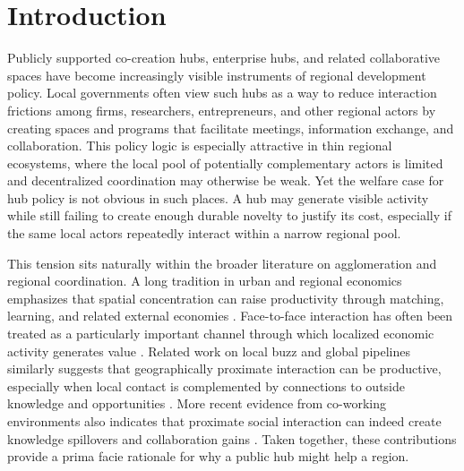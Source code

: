 \section{Introduction}
\label{sec:intro}

Publicly supported co-creation hubs, enterprise hubs, and related collaborative spaces have become increasingly visible instruments of regional development policy. Local governments often view such hubs as a way to reduce interaction frictions among firms, researchers, entrepreneurs, and other regional actors by creating spaces and programs that facilitate meetings, information exchange, and collaboration. This policy logic is especially attractive in thin regional ecosystems, where the local pool of potentially complementary actors is limited and decentralized coordination may otherwise be weak. Yet the welfare case for hub policy is not obvious in such places. A hub may generate visible activity while still failing to create enough durable novelty to justify its cost, especially if the same local actors repeatedly interact within a narrow regional pool.

This tension sits naturally within the broader literature on agglomeration and regional coordination. A long tradition in urban and regional economics emphasizes that spatial concentration can raise productivity through matching, learning, and related external economies \citep{DurantonPuga2004,RosenthalStrange2004}. Face-to-face interaction has often been treated as a particularly important channel through which localized economic activity generates value \citep{StorperVenables2004}. Related work on local buzz and global pipelines similarly suggests that geographically proximate interaction can be productive, especially when local contact is complemented by connections to outside knowledge and opportunities \citep{BatheltMalmbergMaskell2004}. More recent evidence from co-working environments also indicates that proximate social interaction can indeed create knowledge spillovers and collaboration gains \citep{RocheOettlCatalini2024}. Taken together, these contributions provide a prima facie rationale for why a public hub might help a region.

